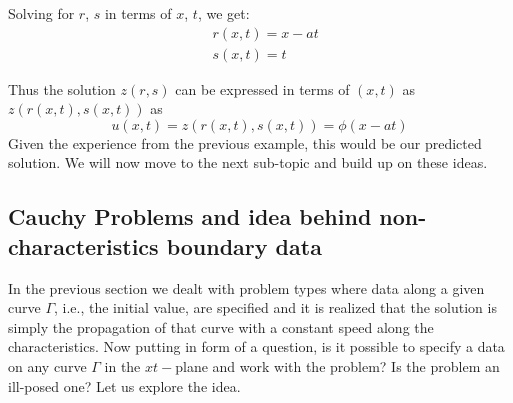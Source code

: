 \documentclass[11pt, a4paper]{report}
\begin{document}
Solving for $r$, $s$ in terms of $x$, $t$, we get:
\begin{equation*}
    \begin{aligned}
        & r(x, t) = x - at\\[-0.5em]
        & s(x, t) = t
    \end{aligned}
\end{equation*}

Thus the solution $z(r, s)$ can be expressed in terms of $(x, t)$ as $z(r(x,t), s(x,t))$ as
\begin{equation*}
    u(x, t) = z(r(x, t), s(x, t)) = \phi(x - at)
\end{equation*}
Given the experience from the previous example, this would be our predicted solution. We will now move
to the next sub-topic and build up on these ideas. 

\subsection{Cauchy Problems and idea behind non-characteristics boundary data} \label{cauchyandnoncharacteristic}
In the previous section we dealt with problem types where data along a given curve $\Gamma$, i.e., the 
initial value, are specified and it is realized that the solution is simply the propagation of that curve
with a constant speed along the characteristics. Now putting in form of a question, is it possible to 
specify a data on any curve $\Gamma$ in the $xt-$plane and work with the problem? Is the problem an 
ill-posed one? Let us explore the idea. 
\end{document}
